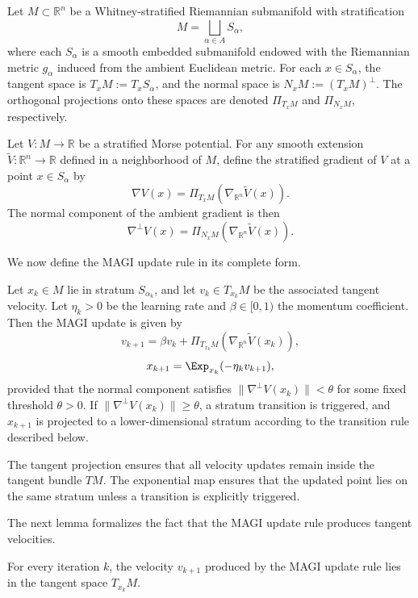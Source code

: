 \documentclass[12pt]{article}
\begin{document}
Let $M \subset \mathbb{R}^n$ be a Whitney-stratified Riemannian submanifold with stratification
\[
M = \bigsqcup_{\alpha \in A} S_\alpha,
\]
where each $S_\alpha$ is a smooth embedded submanifold endowed with the Riemannian metric $g_\alpha$ induced from the ambient Euclidean metric. For each $x \in S_\alpha$, the tangent space is $T_x M := T_x S_\alpha$, and the normal space is $N_x M := (T_x M)^\perp$. The orthogonal projections onto these spaces are denoted $\Pi_{T_x M}$ and $\Pi_{N_x M}$, respectively.

Let $V : M \to \mathbb{R}$ be a stratified Morse potential. For any smooth extension $\widetilde{V} : \mathbb{R}^n \to \mathbb{R}$ defined in a neighborhood of $M$, define the stratified gradient of $V$ at a point $x \in S_\alpha$ by
\[
\nabla V(x) = \Pi_{T_x M} \left( \nabla_{\mathbb{R}^n} \widetilde{V}(x) \right).
\]
The normal component of the ambient gradient is then
\[
\nabla^\perp V(x) = \Pi_{N_x M} \left( \nabla_{\mathbb{R}^n} \widetilde{V}(x) \right).
\]

We now define the MAGI update rule in its complete form.

\begin{definition}
Let $x_k \in M$ lie in stratum $S_{\alpha_k}$, and let $v_k \in T_{x_k} M$ be the associated tangent velocity. Let $\eta_k > 0$ be the learning rate and $\beta \in [0,1)$ the momentum coefficient. Then the MAGI update is given by
\[
v_{k+1} = \beta v_k + \Pi_{T_{x_k} M}\left( \nabla_{\mathbb{R}^n} \widetilde{V}(x_k) \right),
\]
\[
x_{k+1} = \Exp_{x_k}(-\eta_k v_{k+1}),
\]
provided that the normal component satisfies $\|\nabla^\perp V(x_k)\| < \theta$ for some fixed threshold $\theta > 0$. If $\|\nabla^\perp V(x_k)\| \geq \theta$, a stratum transition is triggered, and $x_{k+1}$ is projected to a lower-dimensional stratum according to the transition rule described below.
\end{definition}

The tangent projection ensures that all velocity updates remain inside the tangent bundle $TM$. The exponential map ensures that the updated point lies on the same stratum unless a transition is explicitly triggered.

The next lemma formalizes the fact that the MAGI update rule produces tangent velocities.

\begin{lemma}
For every iteration $k$, the velocity $v_{k+1}$ produced by the MAGI update rule lies in the tangent space $T_{x_k} M$.
\end{lemma}
\end{document}
